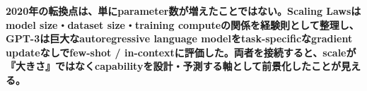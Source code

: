 \noindent\textbf{2020年の転換点は、単にparameter数が増えたことではない。Scaling Lawsはmodel size・dataset size・training computeの関係を経験則として整理し、GPT-3は巨大なautoregressive language modelをtask-specificなgradient updateなしでfew-shot / in-contextに評価した。両者を接続すると、scaleが『大きさ』ではなくcapabilityを設計・予測する軸として前景化したことが見える。}\autocite{src-0fc45aa25dc7,src-7a3002b6ab1d,src-8f27ffb5bc66}
